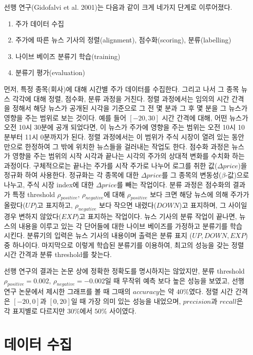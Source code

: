 \documentclass[a4paper,10pt]{article}
\begin{document}
선행 연구(Gidofalvi et al. 2001)는 다음과 같이 크게 네가지 단계로 이루어졌다.
\begin{enumerate}
\item 주가 데이터 수집
\item 주가에 따른 뉴스 기사의 정렬(alignment), 점수화(scoring), 분류(labelling)
\item 나이브 베이즈 분류기 학습(training)
\item 분류기 평가(evaluation)
\end{enumerate}
먼저, 특정 종목(회사)에 대해 시간별 주가 데이터를 수집한다.
그리고 나서 그 종목 뉴스 각각에 대해 정렬, 점수화, 분류 과정을 거친다.
정렬 과정에서는 임의의 시간 간격을 정해서 해당 뉴스가 공개된 시각을 기준으로 그 전 몇 분과 그 후 몇 분을 그 뉴스가 영향을 주는 범위로 보는 것이다.
예를 들어 $[-20, 30]$ 시간 간격에 대해, 어떤 뉴스가 오전 10시 30분에 공개 되었다면, 이 뉴스가 주가에 영향을 주는 범위는 오전 10시 10분부터 11시 0분까지가 된다.
정렬 과정에서는 이 범위가 주식 시장이 열려 있는 동안만으로 한정하여 그 밖에 위치한 뉴스들을 걸러내는 작업도 한다.
점수화 과정은 뉴스가 영향을 주는 범위의 시작 시각과 끝나는 시각의 주가의 상대적 변화를 수치화 하는 과정이다.
구체적으로는 끝나는 주가를 시작 주가로 나누어 로그를 취한 값($\Delta price$)을 정규화 하여 사용한다.
정규화는 각 종목에 대한 $\Delta price$를 그 종목의 변동성($\beta$-값)으로 나누고, 주식 시장 index에 대한 $\Delta price$를 빼는 작업이다.
분류 과정은 점수화의 결과가 특정 threshold $\rho_{positive}$, $\rho_{negative}$에 대해
$\rho_{positive}$ 보다 크면 해당 뉴스에 의해 주가가 올랐다($UP$)고 표지하고,
$\rho_{negative}$ 보다 작으면 내렸다($DOWN$)고 표지하며,
그 사이일 경우 변하지 않았다($EXP$)고 표지하는 작업이다.
뉴스 기사의 분류 작업이 끝나면, 뉴스의 내용을 이루고 있는 각 단어들에 대한 나이브 베이즈를 가정하고 분류기를 학습 시킨다.
분류기의 입력은 뉴스 기사의 내용이며 출력은 분류 표지 ($UP, DOWN, EXP$) 중 하나이다.
마지막으로 이렇게 학습된 분류기를 이용하여, 최고의 성능을 갖는 정렬 시간 간격과 분류 threshold를 찾는다.

선행 연구의 결과는 논문 상에 정확한 정확도를 명시하지는 않았지만,
분류 threshold $\rho_{positive}=0.002$, $\rho_{negative}=-0.002$일 때 무작위 예측 보다 높은 성능을 보였고,
선행 연구 논문에서 제시한 그래프를 볼 때 그때의 $accuracy$는 약 $40\%$였다.
정렬 시간 간격은 $[-20,0]$과 $[0,20]$일 때 가장 의미 있는 성능을 내었으며,
$precision$과 $recall$은 각 표지별로 다르지만 $30\%$에서 $50\%$ 사이였다.

\section{데이터 수집}
\end{document}
